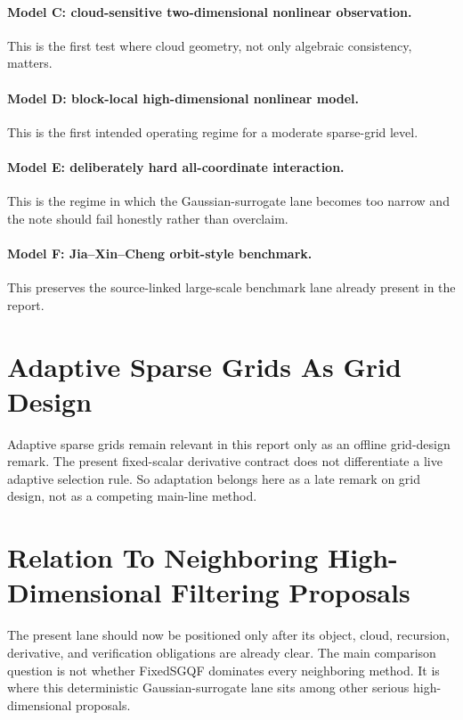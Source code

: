 \documentclass[11pt]{article}
\numberwithin{equation}{section}
\begin{document}
\paragraph{Model C: cloud-sensitive two-dimensional nonlinear observation.}
This is the first test where cloud geometry, not only algebraic consistency,
matters.

\paragraph{Model D: block-local high-dimensional nonlinear model.}
This is the first intended operating regime for a moderate sparse-grid level.

\paragraph{Model E: deliberately hard all-coordinate interaction.}
This is the regime in which the Gaussian-surrogate lane becomes too narrow and the
note should fail honestly rather than overclaim.

\paragraph{Model F: Jia--Xin--Cheng orbit-style benchmark.}
This preserves the source-linked large-scale benchmark lane already present in the
report.

\section{Adaptive Sparse Grids As Grid Design}
\label{sec:p31-adaptive-grid-design}

Adaptive sparse grids remain relevant in this report only as an offline grid-design
remark.  The present fixed-scalar derivative contract does not differentiate a
live adaptive selection rule.  So adaptation belongs here as a late remark on grid
design, not as a competing main-line method.

\section{Relation To Neighboring High-Dimensional Filtering Proposals}
\label{sec:p31-comparison}

The present lane should now be positioned only after its object, cloud,
recursion, derivative, and verification obligations are already clear.  The main
comparison question is not whether FixedSGQF dominates every neighboring method.
It is where this deterministic Gaussian-surrogate lane sits among other serious
high-dimensional proposals.
\end{document}
